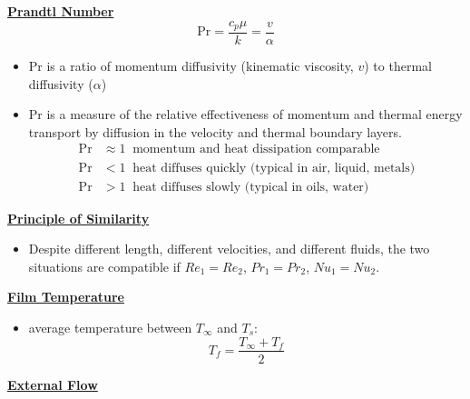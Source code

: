 \textbf{\underline{Prandtl Number}}
\begin{equation*}
    \text{Pr} = \frac{c_p \mu}{k} = \frac{v}{\alpha}
\end{equation*}
\begin{itemize}
    \item \color{red}Pr \color{black} is a ratio of \color{blue} momentum diffusivity \color{black} (kinematic viscosity, $v$) to \color{blue} thermal diffusivity \color{black} ($\alpha$)
    \item \color{red} Pr \color{black} is a measure of the \color{blue} relative effectiveness of momentum \color{black} and \color{blue} thermal energy transport \color{black} by diffusion in the velocity and thermal boundary layers.
    \begin{align*}
        \text{Pr} &\approx 1 \; \; \text{momentum and heat dissipation comparable} \\
        \text{Pr} &< 1 \;\; \text{heat diffuses quickly (typical in air, liquid, metals)} \\
        \text{Pr} &> 1 \;\;\text{heat diffuses slowly (typical in oils, water)}
    \end{align*}
\end{itemize}
\textbf{\underline{Principle of Similarity}}
\begin{itemize}
    \item Despite different length, different velocities, and different fluids, the two situations are compatible if $Re_1=Re_2$, $Pr_1 = Pr_2$, $Nu_1 = Nu_2$.
\end{itemize}

\textbf{\underline{Film Temperature}}
\begin{itemize}
    \item average temperature between $T_{\infty}$ and $T_{s}$: 
    \begin{equation*}
        T_f = \frac{T_{\infty}+T_{f}}{2}
    \end{equation*}
\end{itemize}

\textbf{\Large \underline{External Flow}}

